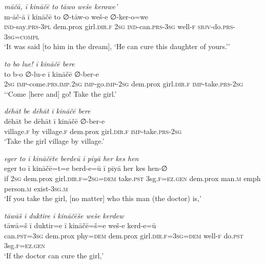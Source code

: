 \ea \label{ŽP.156}
\textit{māčā, ī kināčē to tāwo weše kerowe’} \\ 
\gll m-āč-ā ī kināčē to ∅-tāw-o weš-e ∅-ker-o=we \\ 
 \textsc{ind-}say\textsc{.prs}\textsc{-3pl} dem.prox girl\textsc{.dir}\textsc{.f} \textsc{2sg} \textsc{ind-}can\textsc{.prs}\textsc{-3sg} well\textsc{-f} \textsc{sbjv-}do\textsc{.prs}\textsc{-3sg}\textsc{=compl} \\ 
\glt `It was said [to him in the dream], ‘He can cure this daughter of yours.’'
\z 
 
\ea \label{ŽP.159}
\textit{to bo lue! ī kināčē bere} \\ 
\gll to b-o ∅-lu-e ī kināčē ∅-ber-e \\ 
 \textsc{2sg} \textsc{imp-}come\textsc{.prs}\textsc{.imp}\textsc{.\textsc{2sg}} \textsc{imp-}go.\textsc{imp-}\textsc{2sg} dem.prox girl\textsc{.dir}\textsc{.f} \textsc{imp-}take\textsc{.prs}-\textsc{2sg} \\ 
\glt `‘Come [here and] go! Take the girl.'
\z 
 
\ea \label{ŽP.162}
\textit{dēhāt be dēhāt ī kināčē bere} \\ 
\gll dēhāt be dēhāt ī kināčē ∅-ber-e \\ 
 village\textsc{.f} by village\textsc{.f} dem.prox girl\textsc{.dir}\textsc{.f} \textsc{imp-}take\textsc{.prs}-\textsc{2sg} \\ 
\glt `Take the girl village by village.'
\z 
 
\ea \label{ŽP.163}
\textit{eger to ī kināčēte berdeū ī pīyā her kes hen} \\ 
\gll eger to ī kināčē=t=e berd-e=ū ī pīyā her kes hen-∅ \\ 
 if \textsc{2sg} dem.prox girl\textsc{.dir}\textsc{.f}\textsc{=\textsc{2sg}}\textsc{=dem} take\textsc{.pst} 3sg\textsc{.f}\textsc{\textsc{=ez.gen}} dem.prox man\textsc{.m} emph person\textsc{.m} exist\textsc{-3sg}\textsc{.m} \\ 
\glt `If you take the girl, [no matter] who this man (the doctor) is,'
\z 
 
\ea \label{ŽP.164}
\textit{tāwāš ī duktire ī kināčēše weše kerdew} \\ 
\gll tāwā=š ī duktir=e ī kināčē=š=e weš-e kerd-e=ū \\ 
 can\textsc{.pst}\textsc{=3sg} dem.prox phy\textsc{=dem} dem.prox girl\textsc{.dir}\textsc{.f}\textsc{=3sg}\textsc{=dem} well\textsc{-f} do\textsc{.pst} 3sg\textsc{.f}\textsc{\textsc{=ez.gen}} \\ 
\glt `If the doctor can cure the girl,'
\z 
 
